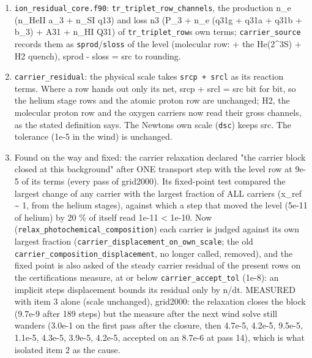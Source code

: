 \documentclass[english,a4paper]{my_memo}
\providecommand{\tightlist}{\setlength{\itemsep}{0pt}\setlength{\parskip}{0pt}}
\begin{document}
\begin{enumerate}
\def\labelenumi{\arabic{enumi}.}
\tightlist
\item
  \texttt{ion\_residual\_core.f90}: \texttt{tr\_triplet\_row\_channels}, the production
  n\_e (n\_HeII a\_3 + n\_SI q13) and loss n3 (P\_3 + n\_e (q31g + q31a + q31b +
  b\_3) + A31 + n\_HI Q31) of \texttt{tr\_triplet\_row}\textquotesingle s own terms; \texttt{carrier\_source}
  records them as \texttt{sprod}/\texttt{sloss} of the level (molecular row: + the
  He(2\^{}3S) + H2 quench), sprod - sloss = src to rounding.
\item
  \texttt{carrier\_residual}: the physical scale takes \texttt{srcp\ +\ srcl} as its reaction
  terms. Where a row hands out only its net, srcp + srcl = \textbar src\textbar{} bit for bit,
  so the helium stage rows and the atomic proton row are unchanged; H2, the
  molecular proton row and the oxygen carriers now read their gross
  channels, as the stated definition says. The Newton\textquotesingle s own scale (\texttt{dsc})
  keeps \textbar src\textbar. The tolerance (1e-5 in the wind) is unchanged.
\item
  Found on the way and fixed: the carrier relaxation declared "the carrier
  block closed at this background" after ONE transport step with the level
  row at 9e-5 of its terms (every pass of grid2000). Its fixed-point test
  compared the largest change of any carrier with the largest fraction of
  ALL carriers (x\_ref \textasciitilde{} 1, from the helium stages), against which a step
  that moved the level (5e-11 of helium) by 20 \% of itself read 1e-11 \textless{} 1e-10.
  Now (\texttt{relax\_photochemical\_composition}) each carrier is judged against its
  own largest fraction (\texttt{carrier\_displacement\_on\_own\_scale}; the old
  \texttt{carrier\_composition\_displacement}, no longer called, removed), and the
  fixed point is also asked of the steady carrier residual of the present
  rows on the certification\textquotesingle s measure, at or below \texttt{carrier\_accept\_tol}
  (1e-8): an implicit step\textquotesingle s displacement bounds its residual only by n/dt.
  MEASURED with item 3 alone (scale unchanged), grid2000: the relaxation
  closes the block (9.7e-9 after 189 steps) but the measure after the next
  wind solve still wanders (3.0e-1 on the first pass after the closure,
  then 4.7e-5, 4.2e-5, 9.5e-5, 1.1e-5, 4.3e-5, 3.9e-5, 4.2e-5, accepted on an
  8.7e-6 at pass 14), which is what isolated item 2 as the cause.
\end{enumerate}
\end{document}
